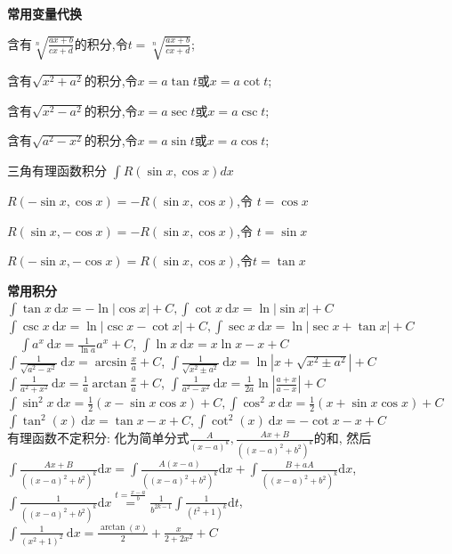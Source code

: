 \documentclass[UTF8]{ctexart}
\begin{document}
\noindent \textbf{常用变量代换}\par 
含有$\sqrt[n]{\frac{ax+b}{cx+d}}$的积分,令$t=\sqrt[n]{\frac{a x+b}{c x+d}}$;\par 
含有$\sqrt{x^{2}+a^{2}}$的积分,令$x=a \tan t$或$x=a \cot t$;\par 
含有$\sqrt{x^{2}-a^{2}}$的积分,令$x=a \sec t$或$x=a \csc t$;\par 
含有$\sqrt{a^{2}-x^{2}}$的积分,令$x=a \sin t$或$x=a \cos t$;\par
三角有理函数积分 $\int R(\sin x, \cos x) dx$\par 
$R(-\sin x, \cos x)=-R(\sin x, \cos x)$,令 $t=\cos x $\par 
$R(\sin x,-\cos x)=-R(\sin x, \cos x)$,令 $t=\sin x $\par 
$R(-\sin x,-\cos x)=R(\sin x, \cos x)$,令$t=\tan x$


\noindent \textbf{常用积分}\\
$\int\tan x \mathrm{~d} x=-\ln |\cos x|+C,\int\cot x \mathrm{~d} x=\ln |\sin x|+C $\\
$\int\csc x\mathrm{~d}x=\ln|\csc x-\cot x|+C,\int\sec x \mathrm{~d} x=\ln |\sec x+\tan x|+C $\\
$\quad \int a^{x} \mathrm{~d} x=\frac{1}{\ln a} a^{x}+C $, $\int \ln x \mathrm{~d} x= x \ln x -x +C$\\
$\int \frac{1}{\sqrt{a^2-x^{2}}} \mathrm{~d} x=\arcsin\frac{x}{a}+C $,
$\int \frac{1}{\sqrt{x^{2}\pm a^{2}}} \mathrm{~d} x=\ln \left|x+\sqrt{x^{2}\pm a^{2}}\right|+C$ \\
$\int \frac{1}{a^2+x^{2}} \mathrm{~d} x=\frac{1}{a}\arctan\frac{x}{a}+C $,
$\int \frac{1}{a^2-x^2}\mathrm{~d}x=\frac{1}{2a}\ln|\frac{a+x}{a-x}|+C $\\
$\int \sin ^{2} x \mathrm{~d} x=\frac{1}{2}(x-\sin x \cos x)+C ,\int \cos ^{2} x \mathrm{~d} x=\frac{1}{2}(x+\sin x \cos x)+C$\\
$\int \tan^2(x)\mathrm{~d} x=\tan x-x+C,\int\cot^2(x)\mathrm{~d} x=-\cot x-x+C$ \\
有理函数不定积分: 化为简单分式$\frac{A}{(x-a)^{k}}, \frac{A x+B}{\left((x-a)^{2}+b^{2}\right)^{k}}$的和, 然后
$\int \frac{A x+B}{\left((x-a)^{2}+b^{2}\right)^{k}} \mathrm{d} x 
= \int \frac{A(x-a)}{\left((x-a)^{2}+b^{2}\right)^{k}} \mathrm{d} x
+\int \frac{B+a A}{\left((x-a)^{2}+b^{2}\right)^{k}} \mathrm{d} x $, 
$\int \frac{1}{\left((x-a)^{2}+b^{2}\right)^{k}} \mathrm{d} x \stackrel{t=\frac{x-a}{b}}{=}
\frac{1}{b^{2 k-1}} \int \frac{1}{\left(t^{2}+1\right)^{k}} \mathrm{d} t$, \\
$\int \frac{1}{\left(x^{2}+1\right)^{2}} \mathrm{~d} x=\frac{\arctan(x)}{2}+\frac{x}{2+2x^2}+C$\\
\end{document}

